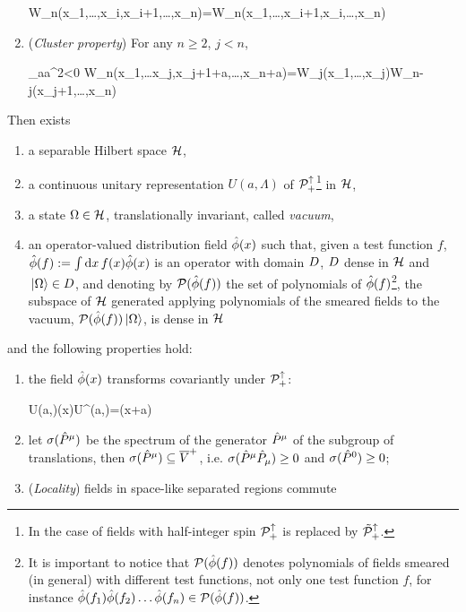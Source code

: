 \documentclass[../main/main.tex]{subfiles}
\begin{document}
\begin{theorem}
\begin{enumerate}[label=(\arabic*)]
		\begin{eq}
			W_n(x_1,\ldots,x_i,x_{i+1},\ldots,x_n)=W_n(x_1,\ldots,x_{i+1},x_i,\ldots,x_n)
		\end{eq}
		\item (\emph{Cluster property}) For any $n\geq2$, $j<n$,
		\begin{eq}
			\lim_{a\to\infty\atop a^2<0} W_n(x_1,\ldots x_j,x_{j+1}+a,\ldots,x_n+a)=W_j(x_1,\ldots,x_j)W_{n-j}(x_{j+1},\ldots,x_n)
		\end{eq}
	\end{enumerate}
	Then exists
	\begin{enumerate}[label=(\arabic*')]
		\item a separable Hilbert space $\mathcal H$,
		\item a continuous unitary representation $U(a,\Lambda)$ of $\mathcal P_+^\uparrow$\footnote{In the case of fields with half-integer spin $\mathcal P_+^\uparrow$ is replaced by $\tilde {\mathcal P}_+^\uparrow$.} in $\mathcal H$,
		\item a state $\Omega\in\mathcal H$, translationally invariant, called \emph{vacuum},
		\item an operator-valued distribution field $\hat{\phi}(x)$ such that, given a test function $f$, $\hat{\phi}(f):=\int\textnormal{d} x\,f(x)\hat{\phi}(x)$ is an operator with domain $D$, $D$ dense in $\mathcal H$ and $\,\vert\Omega\rangle\in D$, and denoting by $\mathcal P(\hat{\phi}(f))$ the set of polynomials of $\hat{\phi}(f)$\footnote{It is important to notice that $\mathcal P(\hat{\phi}(f))$ denotes polynomials of fields smeared (in general) with different test functions, not only one test function $f$, for instance $\hat{\phi}(f_1)\hat{\phi}(f_2)\ldots\hat{\phi}(f_n)\in\mathcal P(\hat{\phi}(f))$.}, the subspace of $\mathcal H$ generated applying polynomials of the smeared fields to the vacuum, $\mathcal P(\hat{\phi}(f))\,\vert\Omega\rangle$, is dense in $\mathcal H$
	\end{enumerate}
	and the following properties hold:
	\begin{enumerate}[label=(\arabic*'), resume]
		\item the field $\hat{\phi}(x)$ transforms covariantly under $\mathcal P_+^\uparrow$:
		\begin{eq}
			U(a,\Lambda)\ophi(x)U^\dagger(a,\Lambda)=\ophi(\Lambda x+a)
		\end{eq}
		\item let $\sigma(\hat{P}^\mu)$ be the spectrum of the generator $\hat{P}^\mu$ of the subgroup of translations, then $\sigma(\hat{P}^\mu)\subseteq\overline V^+$, i.e. $\sigma(\hat{P}^\mu\hat{P}_\mu)\geq 0$ and $\sigma(\hat{P}^0)\geq 0$;
		\item (\emph{Locality}) fields in space-like separated regions commute

\end{enumerate}
\end{theorem}
\end{document}
